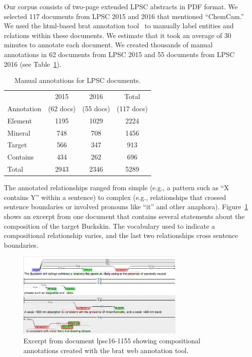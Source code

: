 \documentclass[letterpaper]{article} %
\begin{document}
Our corpus consists of two-page extended LPSC abstracts in PDF format.
We selected 117 documents from LPSC 2015 and 2016 that mentioned
``ChemCam.''  We used the html-based brat annotation tool~\cite{brat}
to manually label entities and relations within these documents.  We
estimate that it took an average of 30 minutes to annotate each
document.  We created thousands of manual annotations in 62 documents
from LPSC 2015 and 55 documents from LPSC 2016 (see
Table~\ref{tab:docs}).

\begin{table}
\caption{Manual annotations for LPSC documents.}
\label{tab:docs}
\begin{center}
\begin{tabular}{l|ccc}
           & 2015     & 2016     & Total \\ 
Annotation & (62 docs) & (55 docs) & (117 docs)\\ \hline
Element  & 1195 & 1029 & 2224 \\
Mineral  & 748  & 708  & 1456 \\
Target   & 566  & 347  &  913 \\ \hline
Contains & 434  & 262  &  696 \\ \hline
Total    & 2943 & 2346 & 5289 \\ \hline
\end{tabular}
\end{center}
\end{table}

The annotated relationships ranged from simple (e.g., a pattern such
as ``X contains Y'' within a sentence) to complex (e.g., relationships
that crossed sentence boundaries or involved pronouns like ``it'' and
other anaphora).  Figure~\ref{fig:brat} shows an excerpt from one
document that contains several statements about the composition of the
target Buckskin.  The vocabulary used to indicate a compositional
relationship varies, and the last two relationships cross sentence
boundaries.  

\begin{figure}
\begin{center}
\includegraphics[width=3.25in]{fig/brat-example.png}
\end{center}
\caption{Excerpt from document lpsc16-1155 showing compositional
annotations created with the brat web annotation tool.}
\label{fig:brat}
\end{figure}
\end{document}
